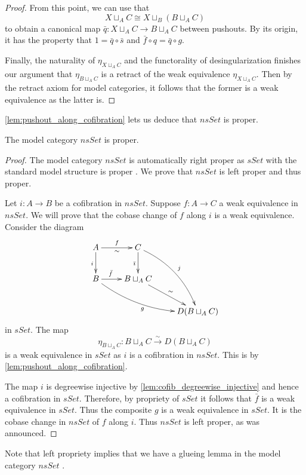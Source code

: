 \begin{proof}
From this point, we can use that
\[X\sqcup _AC\cong X\sqcup _B(B\sqcup _AC)\]
to obtain a canonical map $\bar{q} :X\sqcup _AC\to B\sqcup _AC$ between pushouts. By its origin, it has the property that $1=\bar{q} \circ \bar{s}$ and $\bar{f} \circ q=\bar{q} \circ g$.

Finally, the naturality of $\eta _{X\sqcup _AC}$ and the functorality of desingularization finishes our argument that $\eta _{B\sqcup _AC}$ is a retract of the weak equivalence $\eta _{X\sqcup _AC}$. Then by the retract axiom for model categories, it follows that the former is a weak equivalence as the latter is.
\end{proof}
\noindent \cref{lem:pushout_along_cofibration} lets us deduce that $nsSet$ is proper.
\begin{proposition}\label{prop:axiom_of_propriety}
The model category $nsSet$ is proper.
\end{proposition}
\begin{proof}
The model category $nsSet$ is automatically right proper as $sSet$ with the standard model structure is proper \cite[Thm.~13.1.13, p.~242]{Hi03}. We prove that $nsSet$ is left proper and thus proper.

Let $i:A\to B$ be a cofibration in $nsSet$. Suppose $f:A\to C$ a weak equivalence in $nsSet$. We will prove that the cobase change of $f$ along $i$ is a weak equivalence. Consider the diagram
\begin{displaymath}
\xymatrix{
A \ar[d]_i \ar[r]^f_\sim & C \ar[d]_{\bar{\imath } } \ar@/^1pc/[ddr]^j \\
B \ar[r]^(.35){\bar{f} } \ar@/_1pc/[drr]_g & B\sqcup _AC \ar[dr]^\sim \\
&& D(B\sqcup _AC)
}
\end{displaymath}
in $sSet$. The map
\[\eta _{B\sqcup _AC}:B\sqcup _AC\xrightarrow{\sim } D(B\sqcup _AC)\]
is a weak equivalence in $sSet$ as $i$ is a cofibration in $nsSet$. This is by \cref{lem:pushout_along_cofibration}.

The map $i$ is degreewise injective by \cref{lem:cofib_degreewise_injective} and hence a cofibration in $sSet$. Therefore, by propriety of $sSet$ it follows that $\bar{f}$ is a weak equivalence in $sSet$. Thus the composite $g$ is a weak equivalence in $sSet$. It is the cobase change in $nsSet$ of $f$ along $i$. Thus $nsSet$ is left proper, as was announced.
\end{proof}
\noindent Note that left propriety implies that we have a glueing lemma in the model category $nsSet$ \cite[Prop.~13.3.9, p.~246]{Hi03}.

